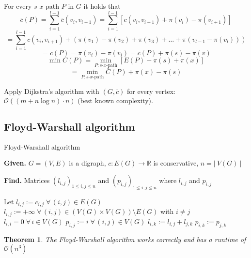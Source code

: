 \documentclass{article}
\newtheorem{theorem}{Theorem}
\newcommand{\card}[1]{\left|\:\!#1\:\!\right|}
\newcommand{\given}[1]{\textbf{Given.} #1\par}
\newcommand{\find}[1]{\textbf{Find.} #1\par}
\newcommand{\gath}[2]{$#1$-$#2$-path} %
\newcommand{\fall}{\;\forall\,}
\begin{document}
For every \gath sx $P$ in $G$ it holds that
\[
  \overline{c}(P)
    = \sum_{i=1}^{l-1} \overline{c}(v_i, v_{i+1})
    = \sum_{i=1}^{l-1} [c(v_i, v_{i+1}) + \pi(v_i) - \pi(v_{i+1})]
\] \[
  = \sum_{i=1}^{l-1} c(v_i, v_{i+1}) + (\pi(v_1) - \pi(v_2) + \pi(v_3) + \ldots + \pi(v_{l-1} - \pi(v_l)))
\] \[
  = c(P) = \pi(v_i) - \pi(v_i) = c(P) + \pi(s) - \pi(v)
\] \[
  \min{C(P)} = \min_{P: \text{\gath sx}} \left[E(P) - \pi(s) + \pi(x)\right]
\] \[
  = \min_{P: \text{\gath sx}} \overline{C}(P) + \pi(x) - \pi(s)
\]

Apply Dijkstra's algorithm with $(G, \overline{c})$ for every vertex: $\mathcal{O}((m + n \log{n}) \cdot n)$ (best known complexity).

\subsection{Floyd-Warshall algorithm}
%
\begin{algorithm}
  \caption{Floyd-Warshall algorithm}
  \label{fw-algo}
  \given{$G = (V, E)$ is a digraph, $c: E(G) \rightarrow \mathbb{R}$ is conservative, $n = \card{V(G)}$}
  \find{Matrices $(l_{i,j})_{1 \leq i,j \leq n}$ and $(p_{i,j})_{1 \leq i,j \leq n}$ where $l_{i,j}$ and $p_{i,j}$}
\begin{algorithmic}[1]
  \State Let $l_{i,j} := c_{i,j} \fall (i,j) \in E(G)$
  \State $l_{i,j} := +\infty \fall (i,j) \in (V(G) \times V(G)) \setminus E(G)$ with $i \neq j$
  \State $l_{i,i} = 0 \fall i \in V(G)$
  \State $p_{i,j} := i \fall (i,j) \in V(G)$
              \State $l_{i,k} := l_{i,j} + l_{j,k}$
              \State $p_{i,k} := p_{j,k}$
            \EndIf
          \EndIf
        \EndFor
      \EndIf
    \EndFor
  \EndFor
\end{algorithmic}
\end{algorithm}




\begin{theorem}\label{satz-3.6}
  The Floyd-Warshall algorithm works correctly and has a runtime of $\mathcal{O}(n^3)$
\end{theorem}
\end{document}

